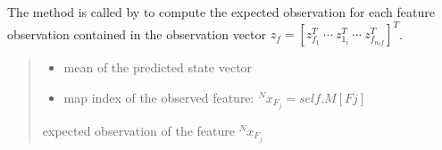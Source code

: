 \documentclass[letterpaper,10pt,english]{sphinxmanual}
\begin{document}
\begin{fulllineitems}
\begin{fulllineitems}
\sphinxAtStartPar
The method is called by {\hyperref[\detokenize{FEKFMBLocalization:MapFeature.MapFeature.hf}]{}} to compute the expected observation for each feature
observation contained in the observation vector \(z_f=[z_{f_1}^T~\cdots~z_{1_i}^T~\cdots~z_{f_{n_zf}}^T]^T\).
\begin{quote}\begin{description}
\begin{itemize}
\item {} 
\sphinxAtStartPar
{} \textendash{} mean of the predicted state vector

\item {} 
\sphinxAtStartPar
{} \textendash{} map index of the observed feature: \(^Nx_{F_j}=self.M[Fj]\)

\end{itemize}

\sphinxAtStartPar
expected observation of the feature \(^Nx_{F_j}\)

\end{description}\end{quote}

\end{fulllineitems}



\end{fulllineitems}
\end{document}
